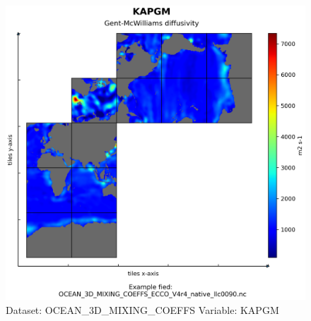 \begin{figure}[H]
\centering
\includegraphics[width=\textwidth]{../images/plots/native_plots/Ocean_3D_Gent-Mcwilliams_Redi_and_Background_Vertical_Diffusivity_Coefficients_for_the_Lat-Lon-Cap_90_(llc90)_Native_Model_Grid_(Version_4_Release_4)/KAPGM.png}
\caption{Dataset: OCEAN\_3D\_MIXING\_COEFFS Variable: KAPGM}
\label{tab:table-OCEAN_3D_MIXING_COEFFS_KAPGM-Plot}
\end{figure}
\pagebreak
